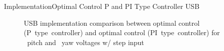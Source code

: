 \documentclass{beamer}
\begin{document}
%
\begin{frame}{Implementation}{Optimal Control P and PI Type Controller USB}
    \begin{figure}
      \centering
      \caption{USB implementation comparison between optimal control (P~type~controller) and optimal control (PI~type~controller) for ~pitch and ~yaw voltages w/ step input}
      \label{fig:PvPIVoltage_USB}
    \end{figure}
\end{frame}
\end{document}
